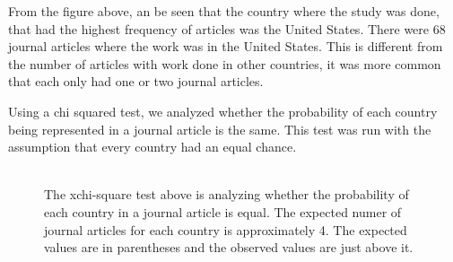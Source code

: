 \documentclass[12pt, letterpaper]{article}
\begin{document}
From the figure above, an be seen that the country where the study was done, that had the highest frequency of articles was the United States. There were 68 journal articles where the work was in the United States. This is different from the number of articles with work done in other countries, it was more common that each only had one or two journal articles. 

Using a chi squared test, we analyzed whether the probability of each country being represented in a journal article is the same. This test was run with the assumption that every country had an equal chance.

\begin{figure}[h]
\begin{center}
\includegraphics[width=0.10]{xchisq_country.pdf}
\caption{The xchi-square test above is analyzing whether the probability of each country in a  journal article is equal. The expected numer of journal articles for each country is approximately 4. The expected values are in parentheses and the observed values are just above it.}
\label{fig: Chi Square for Country}
\end{center}
\end{figure}
\end{document}
